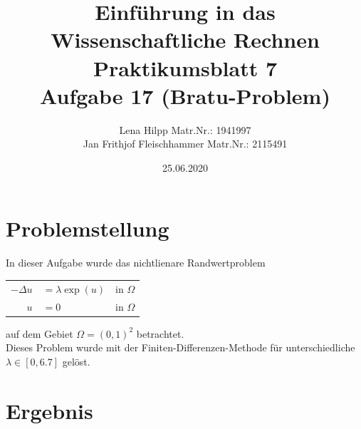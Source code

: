 \documentclass[11pt,a4paper]{article}
\title{Einf\"uhrung in das Wissenschaftliche Rechnen\\
  Praktikumsblatt 7\\
  Aufgabe 17 (Bratu-Problem)}
\author{Lena Hilpp Matr.Nr.: 1941997\\Jan Frithjof Fleischhammer Matr.Nr.: 2115491}
\date{25.06.2020}
\begin{document}
  
  \maketitle
  
  \section*{Problemstellung}


In dieser Aufgabe wurde das nichtlienare Randwertproblem
\begin{center}
\begin{tabular}{rlc}
$-\Delta u$ & $=\lambda \exp(u)$ & in $\Omega$ \\
$u$ & $= 0$ & in $\Omega$

\end{tabular}
\end{center}

auf dem Gebiet $\Omega=(0,1)^2$ betrachtet.\\

Dieses Problem wurde mit der Finiten-Differenzen-Methode f\"ur unterschiedliche $\lambda\in[0,6.7]$ gelöst.
  \newpage
  \section*{Ergebnis}
  
\end{document}
